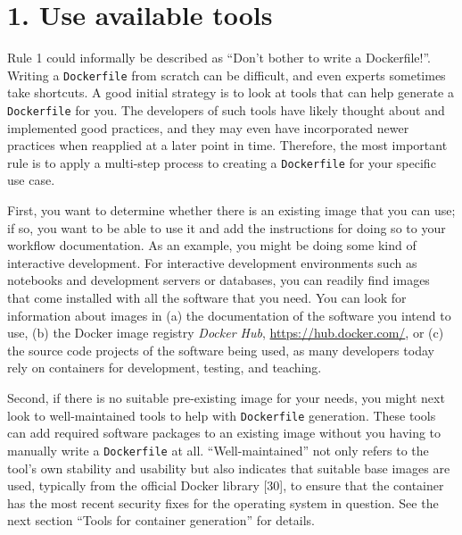 \documentclass[10pt,letterpaper]{article}
\begin{document}
\normalsize

\newpage

\hypertarget{use-available-tools}{%
\section*{1. Use available tools}\label{use-available-tools}}

  \label{rule:tools} 

Rule 1 could informally be described as ``Don't bother to write a
Dockerfile!''. Writing a \texttt{Dockerfile} from scratch can be
difficult, and even experts sometimes take shortcuts. A good initial
strategy is to look at tools that can help generate a
\texttt{Dockerfile} for you. The developers of such tools have likely
thought about and implemented good practices, and they may even have
incorporated newer practices when reapplied at a later point in time.
Therefore, the most important rule is to apply a multi-step process to
creating a \texttt{Dockerfile} for your specific use case.

First, you want to determine whether there is an existing image that you
can use; if so, you want to be able to use it and add the instructions
for doing so to your workflow documentation. As an example, you might be
doing some kind of interactive development. For interactive development
environments such as notebooks and development servers or databases, you
can readily find images that come installed with all the software that
you need. You can look for information about images in (a) the
documentation of the software you intend to use, (b) the Docker image
registry \emph{Docker Hub}, \url{https://hub.docker.com/}, or (c) the
source code projects of the software being used, as many developers
today rely on containers for development, testing, and teaching.

Second, if there is no suitable pre-existing image for your needs, you
might next look to well-maintained tools to help with
\texttt{Dockerfile} generation. These tools can add required software
packages to an existing image without you having to manually write a
\texttt{Dockerfile} at all. ``Well-maintained'' not only refers to the
tool's own stability and usability but also indicates that suitable base
images are used, typically from the official Docker library {[}30{]}, to
ensure that the container has the most recent security fixes for the
operating system in question. See the next section ``Tools for container
generation'' for details.
\end{document}

